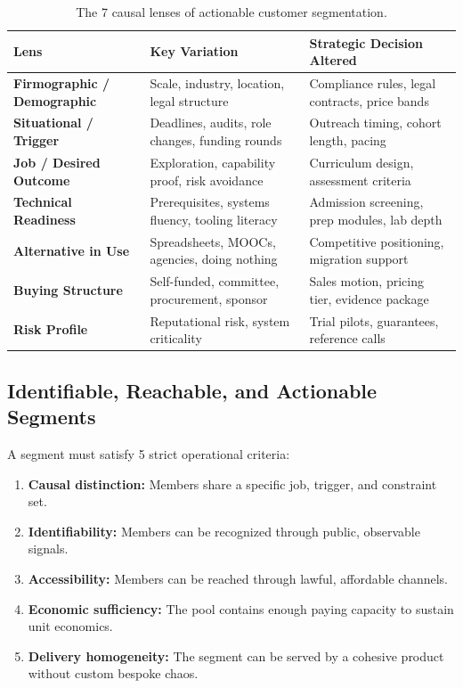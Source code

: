 \begin{table}[h]
\centering
\small
\begin{tabularx}{\columnwidth}{>{\RaggedRight\bfseries}p{2.2cm} >{\RaggedRight}X >{\RaggedRight}p{2.2cm}}
\toprule
Lens & Key Variation & Strategic Decision Altered \\
\midrule
Firmographic / Demographic & Scale, industry, location, legal structure & Compliance rules, legal contracts, price bands \\
\addlinespace
Situational / Trigger & Deadlines, audits, role changes, funding rounds & Outreach timing, cohort length, pacing \\
\addlinespace
Job / Desired Outcome & Exploration, capability proof, risk avoidance & Curriculum design, assessment criteria \\
\addlinespace
Technical Readiness & Prerequisites, systems fluency, tooling literacy & Admission screening, prep modules, lab depth \\
\addlinespace
Alternative in Use & Spreadsheets, MOOCs, agencies, doing nothing & Competitive positioning, migration support \\
\addlinespace
Buying Structure & Self-funded, committee, procurement, sponsor & Sales motion, pricing tier, evidence package \\
\addlinespace
Risk Profile & Reputational risk, system criticality & Trial pilots, guarantees, reference calls \\
\bottomrule
\end{tabularx}
\caption{The 7 causal lenses of actionable customer segmentation.}
\label{tab:ch6_seven_lenses}
\end{table}

\subsection{Identifiable, Reachable, and Actionable Segments}

A segment must satisfy 5 strict operational criteria:
\begin{enumerate}[leftmargin=1.2em,itemsep=0.2ex]
  \item \textbf{Causal distinction:} Members share a specific job, trigger, and constraint set.
  \item \textbf{Identifiability:} Members can be recognized through public, observable signals.
  \item \textbf{Accessibility:} Members can be reached through lawful, affordable channels.
  \item \textbf{Economic sufficiency:} The pool contains enough paying capacity to sustain unit economics.
  \item \textbf{Delivery homogeneity:} The segment can be served by a cohesive product without custom bespoke chaos.
\end{enumerate}


